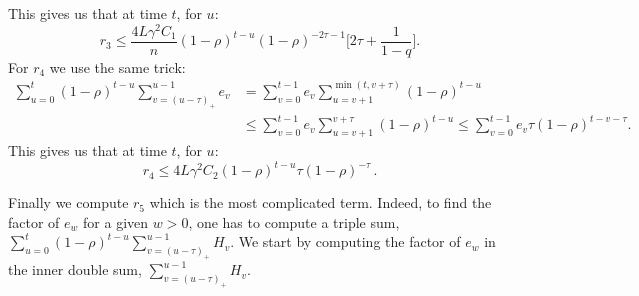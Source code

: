 \documentclass[twoside, 11pt]{article}
\newcommand{\stepsize}{\gamma}
\newcommand{\overlap}{\tau}
\newcommand{\contraction}{\rho}
\newcommand{\lipschitz}{L}
\begin{document}
This gives us that at time $t$, for $u$:
\begin{equation}\label{eq:r3}
r_3 \leq \frac{4\lipschitz\stepsize^2 C_1}{n}(1 - \contraction)^{t-u} (1 - \contraction)^{-2\overlap -1} \big[2\overlap + \frac{1}{1-q}\big] .
\end{equation}
For $r_4$ we use the same trick:
\begin{align}
\sum_{u=0}^t (1-\contraction)^{t-u} \sum_{v=(u-\overlap)_+}^{u-1} e_v
&= \sum_{v=0}^{t-1} e_v  \sum_{u=v+1}^{\min(t, v+\overlap)} (1-\contraction)^{t-u}
\nonumber \\
&\leq \sum_{v=0}^{t-1} e_v  \sum_{u=v+1}^{v+\overlap} (1-\contraction)^{t-u}
\leq \sum_{v=0}^{t-1} e_v \overlap (1-\contraction)^{t-v - \overlap} .
\end{align}
This gives us that at time $t$, for $u$:
\begin{equation}\label{eq:r4}
r_4 \leq 4\lipschitz\stepsize^2 C_2(1 - \contraction)^{t-u} \overlap (1-\contraction)^{-\overlap} \,  .
\end{equation}

Finally we compute $r_5$ which is the most complicated term.
Indeed, to find the factor of $e_w$ for a given $w > 0$, one has to compute a triple sum, $\sum_{u = 0}^t(1 - \contraction)^{t-u} \sum_{v=(u-\overlap)_+}^{u-1} H_v$.
We start by computing the factor of $e_w$ in the inner double sum, $\sum_{v=(u-\overlap)_+}^{u-1} H_v$.
\end{document}
